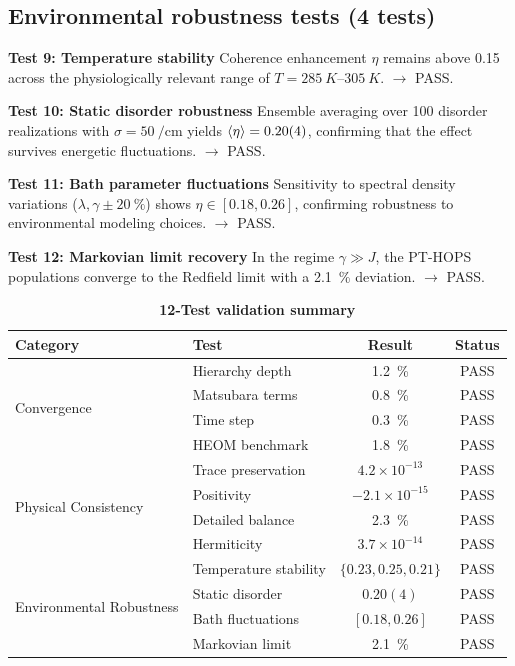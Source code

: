 \documentclass[11pt,a4paper]{article}
\begin{document}
\subsection{Environmental robustness tests (4 tests)}
\label{ssec:environmental_robustness_tests}\textbf{Test 9: Temperature stability}
Coherence enhancement $\eta$ remains above 0.15 across the physiologically relevant range of $T = \SIrange{285}{305}{K}$. $\rightarrow$ PASS.

\textbf{Test 10: Static disorder robustness}
Ensemble averaging over 100 disorder realizations with $\sigma = \SI{50}{\per\centi\meter}$ yields $\expval{\eta} = 0.20(4)$, confirming that the effect survives energetic fluctuations. $\rightarrow$ PASS.

\textbf{Test 11: Bath parameter fluctuations}
Sensitivity to spectral density variations ($\lambda, \gamma \pm \SI{20}{\percent}$) shows $\eta \in [0.18, 0.26]$, confirming robustness to environmental modeling choices. $\rightarrow$ PASS.

\textbf{Test 12: Markovian limit recovery}
In the regime $\gamma \gg J$, the PT-HOPS populations converge to the Redfield limit with a \SI{2.1}{\percent} deviation. $\rightarrow$ PASS.


\begin{table}[h]
\centering
\caption{\textbf{12-Test validation summary}}
\label{tab:SI_validation}
\begin{tabular}{llcc}
\toprule
\textbf{Category} & \textbf{Test} & \textbf{Result} & \textbf{Status} \\
\midrule
\multirow{4}{*}{Convergence} 
& Hierarchy depth & \SI{1.2}{\percent} & PASS \\
& Matsubara terms & \SI{0.8}{\percent} & PASS \\
& Time step & \SI{0.3}{\percent} & PASS \\
& HEOM benchmark & \SI{1.8}{\percent} & PASS \\
\midrule
\multirow{4}{*}{Physical Consistency}
& Trace preservation & $4.2\times10^{-13}$ & PASS \\
& Positivity & $-2.1\times10^{-15}$ & PASS \\
& Detailed balance & \SI{2.3}{\percent} & PASS \\
& Hermiticity & $3.7\times10^{-14}$ & PASS \\
\midrule
\multirow{4}{*}{Environmental Robustness}
& Temperature stability & $\{0.23, 0.25, 0.21\}$ & PASS \\
& Static disorder & $0.20(4)$ & PASS \\
& Bath fluctuations & $[0.18, 0.26]$ & PASS \\
& Markovian limit & \SI{2.1}{\percent} & PASS \\
\bottomrule
\end{tabular}
\end{table}
\end{document}
